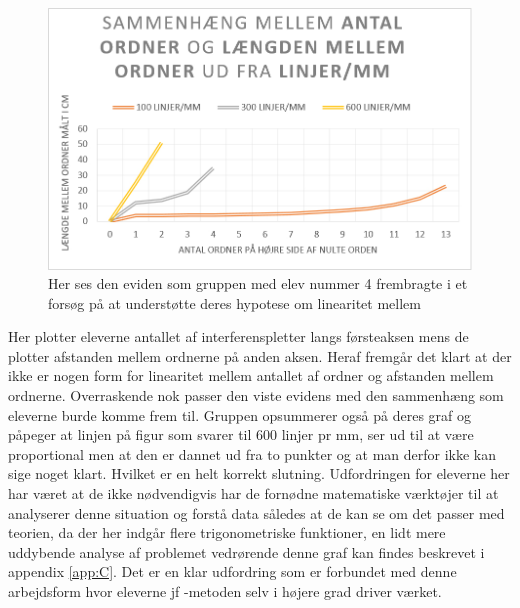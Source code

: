 \begin{figure}[h!]
	\centering
	\includegraphics[width=\textwidth]{Figs/EviJacob}
	\caption[Elev produktion 3]{Her ses den eviden som gruppen med elev nummer 4 frembragte i et forsøg på at understøtte deres hypotese om linearitet mellem }
	\label{fig:evidens.jacob}
\end{figure}

Her plotter eleverne antallet af interferenspletter langs førsteaksen mens de plotter afstanden mellem ordnerne på anden aksen. Heraf fremgår det klart at der ikke er nogen form for linearitet mellem antallet af ordner og afstanden mellem ordnerne. Overraskende nok passer den viste evidens med den sammenhæng som eleverne burde komme frem til. Gruppen opsummerer også på deres graf og påpeger at linjen på figur  som svarer til 600 linjer pr mm, ser ud til at være proportional men at den er dannet ud fra to punkter og at man derfor ikke kan sige noget klart. Hvilket er en helt korrekt slutning.
Udfordringen for eleverne her har været at de ikke nødvendigvis har de fornødne matematiske værktøjer til at analyserer denne situation og forstå data således at de kan se om det passer med teorien, da der her indgår flere trigonometriske funktioner, en lidt mere uddybende analyse af problemet vedrørende denne graf kan findes beskrevet i appendix \vref{app:C}. Det er en klar udfordring som er forbundet med denne arbejdsform hvor eleverne jf \ib-metoden selv i højere grad driver værket. 

